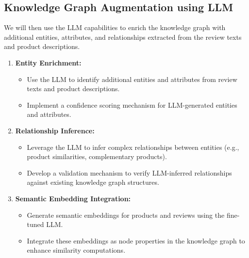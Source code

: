 \documentclass{article}
\begin{document}
\subsection{Knowledge Graph Augmentation using LLM}
We will then use the LLM capabilities to enrich the knowledge graph with additional entities, attributes, and relationships extracted from the review texts and product descriptions.
\begin{enumerate}
    \item \textbf{Entity Enrichment:}
    \begin{itemize}
        \item Use the LLM to identify additional entities and attributes from review texts and product descriptions.
        \item Implement a confidence scoring mechanism for LLM-generated entities and attributes.
    \end{itemize}
    
    \item \textbf{Relationship Inference:}
    \begin{itemize}
        \item Leverage the LLM to infer complex relationships between entities (e.g., product similarities, complementary products).
        \item Develop a validation mechanism to verify LLM-inferred relationships against existing knowledge graph structures.
    \end{itemize}
    
    \item \textbf{Semantic Embedding Integration:}
    \begin{itemize}
        \item Generate semantic embeddings for products and reviews using the fine-tuned LLM.
        \item Integrate these embeddings as node properties in the knowledge graph to enhance similarity computations.
    \end{itemize}

\end{enumerate}
\end{document}
